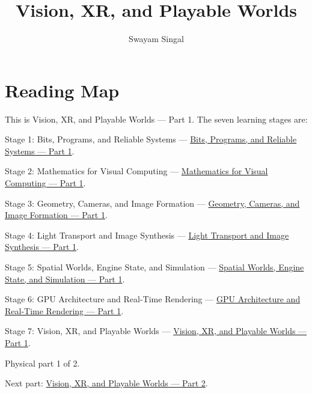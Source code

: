 \documentclass[11pt,twoside,openany]{book}
\title{Vision, XR, and Playable Worlds}
\author{Swayam Singal}
\begin{document}
\maketitle
\begin{center}\end{center}
\chapter*{Reading Map}
\hypertarget{volume-reading-map}{}
\noindent This is Vision, XR, and Playable Worlds --- Part 1. The seven learning stages are:
\par\noindent Stage 1: Bits, Programs, and Reliable Systems --- \href{../01-Bits-Programs-and-Reliable-Systems-P01/main.pdf}{Bits, Programs, and Reliable Systems — Part 1}.
\par\noindent Stage 2: Mathematics for Visual Computing --- \href{../02-Mathematics-for-Visual-Computing-P01/main.pdf}{Mathematics for Visual Computing — Part 1}.
\par\noindent Stage 3: Geometry, Cameras, and Image Formation --- \href{../03-Geometry-Cameras-and-Image-Formation-P01/main.pdf}{Geometry, Cameras, and Image Formation — Part 1}.
\par\noindent Stage 4: Light Transport and Image Synthesis --- \href{../04-Light-Transport-and-Image-Synthesis-P01/main.pdf}{Light Transport and Image Synthesis — Part 1}.
\par\noindent Stage 5: Spatial Worlds, Engine State, and Simulation --- \href{../05-Spatial-Worlds-Engine-State-and-Simulation-P01/main.pdf}{Spatial Worlds, Engine State, and Simulation — Part 1}.
\par\noindent Stage 6: GPU Architecture and Real-Time Rendering --- \href{../06-GPU-Architecture-and-Real-Time-Rendering-P01/main.pdf}{GPU Architecture and Real-Time Rendering — Part 1}.
\par\noindent Stage 7: Vision, XR, and Playable Worlds --- \href{../07-Vision-XR-and-Playable-Worlds-P01/main.pdf}{Vision, XR, and Playable Worlds — Part 1}.
\par\noindent Physical part 1 of 2.
\par\noindent Next part: \href{../07-Vision-XR-and-Playable-Worlds-P02/main.pdf}{Vision, XR, and Playable Worlds — Part 2}.
\tableofcontents
\mainmatter
\setcounter{chapter}{0}








\label{stagechaptersend:07-Vision-XR-and-Playable-Worlds}
\appendix
\end{document}
